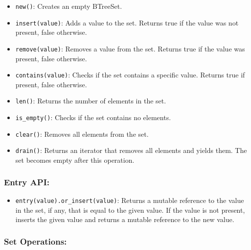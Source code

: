 \documentclass[
  11pt,
]{article}
\providecommand{\tightlist}{%
  \setlength{\itemsep}{0pt}\setlength{\parskip}{0pt}}
\begin{document}
\begin{itemize}
\tightlist
\item
  \texttt{new()}: Creates an empty BTreeSet.
\item
  \texttt{insert(value)}: Adds a value to the set. Returns true if the
  value was not present, false otherwise.
\item
  \texttt{remove(value)}: Removes a value from the set. Returns true if
  the value was present, false otherwise.
\item
  \texttt{contains(value)}: Checks if the set contains a specific value.
  Returns true if present, false otherwise.
\item
  \texttt{len()}: Returns the number of elements in the set.
\item
  \texttt{is\_empty()}: Checks if the set contains no elements.
\item
  \texttt{clear()}: Removes all elements from the set.
\item
  \texttt{drain()}: Returns an iterator that removes all elements and
  yields them. The set becomes empty after this operation.
\end{itemize}

\subsubsection{Entry API:}\label{entry-api-3}

\begin{itemize}
\tightlist
\item
  \texttt{entry(value).or\_insert(value)}: Returns a mutable reference
  to the value in the set, if any, that is equal to the given value. If
  the value is not present, inserts the given value and returns a
  mutable reference to the new value.
\end{itemize}

\subsubsection{Set Operations:}\label{set-operations-1}
\end{document}
